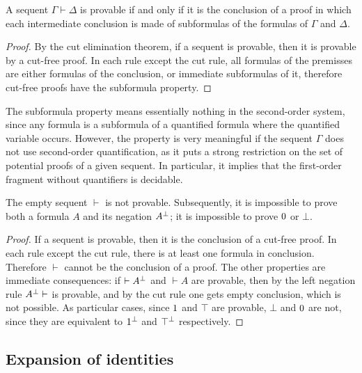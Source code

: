 \begin{theorem}
A sequent $\Gamma\vdash\Delta$ is provable if and only if it is the conclusion of a proof in which each intermediate conclusion is made of subformulas of the
formulas of $\Gamma$ and $\Delta$.
\end{theorem}

\begin{proof}
By the cut elimination theorem, if a sequent is provable, then it is provable by a cut-free proof.
In each rule except the cut rule, all formulas of the premisses are either
formulas of the conclusion, or immediate subformulas of it, therefore
cut-free proofs have the subformula property.
\end{proof}

The subformula property means essentially nothing in the second-order
system, since any formula is a subformula of a quantified formula where
the quantified variable occurs. However, the property is very meaningful
if the sequent \(\Gamma\) does not use second-order quantification, as
it puts a strong restriction on the set of potential proofs of a given
sequent. In particular, it implies that the first-order fragment without
quantifiers is decidable.

\begin{theorem}[consistency]
The empty sequent $\vdash$ is not provable.
Subsequently, it is impossible to prove both a formula $A$ and its
negation $A^\bot$; it is impossible to prove $0$ or
$\bot$.
\end{theorem}

\begin{proof}
If a sequent is provable, then it is the conclusion of a cut-free proof.
In each rule except the cut rule, there is at least one formula in conclusion.
Therefore $\vdash$ cannot be the conclusion of a proof.
The other properties are immediate consequences: if $\vdash A^\bot$
and $\vdash A$ are provable, then by the left negation rule
$A^\bot\vdash$ is provable, and by the cut rule one gets empty
conclusion, which is not possible.
As particular cases, since $1$ and $\top$ are
provable, $\bot$ and $0$ are not, since they are
equivalent to $1^\bot$ and $\top^\bot$
respectively.
\end{proof}

\subsection{Expansion of identities}\label{expansion-of-identities}

